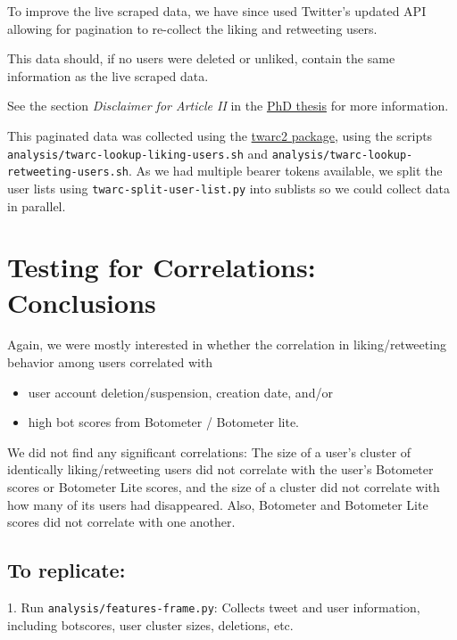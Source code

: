 \documentclass[10pt,english,sigconf,authoryear,nonacm]{article}
\begin{document}
To improve the live scraped data, we have since used Twitter's updated
API allowing for pagination to re-collect the liking and retweeting
users.

This data should, if no users were deleted or unliked, contain the
same information as the live scraped data.

See the section \emph{Disclaimer for Article II} in the \href{https://github.com/LJ-9/Danish-Election-2022-Twitter-Likes-Retweets-Botscores-Inauthentic-Coordinated-Behavior/blob/main/documents/Jahn_Laura_PhD_Thesis_2023_online.pdf}{PhD thesis}
\cite{LauraThesis} for more information.

This paginated data was collected using the \href{https://twarc-project.readthedocs.io/en/latest/twarc2_en_us/}{twarc2 package},
using the scripts \texttt{analysis/twarc-lookup-liking-users.sh} and
\texttt{analysis/twarc-lookup-retweeting-users.sh}. As we had multiple
bearer tokens available, we split the user lists using \texttt{twarc-split-user-list.py}
into sublists so we could collect data in parallel.

\section*{Testing for Correlations: Conclusions}

Again, we were mostly interested in whether the correlation in liking/retweeting
behavior among users correlated with
\begin{itemize}
\item user account deletion/suspension, creation date, and/or
\item high bot scores from Botometer / Botometer lite.
\end{itemize}
We did not find any significant correlations: The size of a user's
cluster of identically liking/retweeting users did not correlate with
the user's Botometer scores or Botometer Lite scores, and the size
of a cluster did not correlate with how many of its users had disappeared.
Also, Botometer and Botometer Lite scores did not correlate with one
another.

\subsection*{To replicate:}

1. Run \texttt{analysis/features-frame.py}: Collects tweet and user
information, including botscores, user cluster sizes, deletions, etc.
\end{document}
